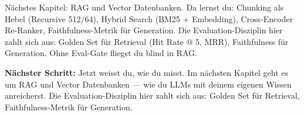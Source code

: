 
\par\mbox{}\par
\begin{AUTORnotizEnv}
Nächstes Kapitel: RAG und Vector Datenbanken. Da lernst du: Chunking als Hebel (Recursive 512/64), Hybrid Search (BM25 + Embedding), Cross-Encoder Re-Ranker, Faithfulness-Metrik für Generation. Die Evaluation-Disziplin hier zahlt sich aus: Golden Set für Retrieval (Hit Rate @ 5, MRR), Faithfulness für Generation. Ohne Eval-Gate fliegst du blind in RAG.
\end{AUTORnotizEnv}

\textbf{Nächster Schritt:} Jetzt weisst du, wie du misst. Im nächsten Kapitel geht es um RAG und Vector Datenbanken — wie du LLMs mit deinem eigenen Wissen anreicherst. Die Evaluation-Disziplin hier zahlt sich aus: Golden Set für Retrieval, Faithfulness-Metrik für Generation.
\endinput

\clearpage